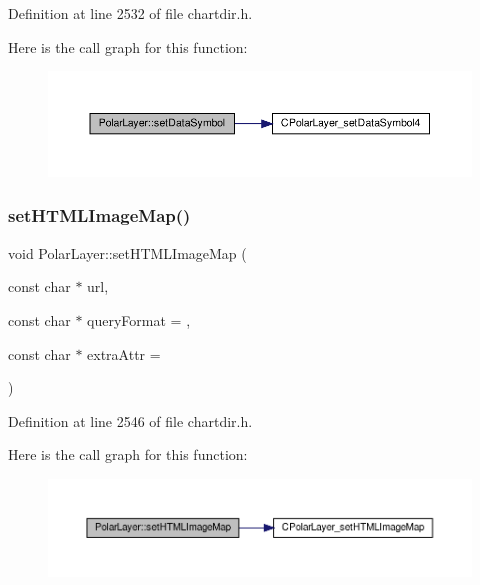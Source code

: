 Definition at line 2532 of file chartdir.\+h.

Here is the call graph for this function\+:
\nopagebreak
\begin{figure}[H]
\begin{center}
\leavevmode
\includegraphics[width=350pt]{class_polar_layer_aed7d56050c359edaaf332732355f80f1_cgraph}
\end{center}
\end{figure}
\mbox{\label{class_polar_layer_a8866698da24c34140d649dcb76e83164}} 
\subsubsection{\texorpdfstring{set\+H\+T\+M\+L\+Image\+Map()}{setHTMLImageMap()}}
{\footnotesize\ttfamily void Polar\+Layer\+::set\+H\+T\+M\+L\+Image\+Map (\begin{DoxyParamCaption}\item[{const char $\ast$}]{url,  }\item[{const char $\ast$}]{query\+Format = {},  }\item[{const char $\ast$}]{extra\+Attr = {} }\end{DoxyParamCaption})\hspace{0.3cm}{\ttfamily [inline]}}



Definition at line 2546 of file chartdir.\+h.

Here is the call graph for this function\+:
\nopagebreak
\begin{figure}[H]
\begin{center}
\leavevmode
\includegraphics[width=350pt]{class_polar_layer_a8866698da24c34140d649dcb76e83164_cgraph}
\end{center}
\end{figure}
\mbox{\label{class_polar_layer_a4a43a7e514a5ef17aae900b41a61c1af}} 
